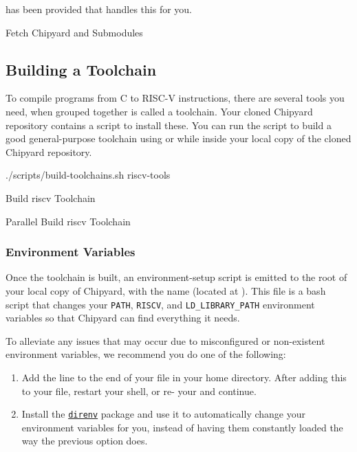  has been provided that handles this for you.

\begin{listing}[h!tbp]
\caption{Fetch Chipyard and Submodules}
\label{lst:Fetch_Chipyard_and_Submodules}
\end{listing}

\subsection{Building a Toolchain}\label{sec:Building_Toolchain}
To compile programs from C to RISC-V instructions, there are several tools you need, when grouped together is called a toolchain.
Your cloned Chipyard repository contains a script to install these.
You can run the script to build a good general-purpose toolchain using  or  while inside your local copy of the cloned Chipyard repository.

\begin{listing}[h!tbp]
\begin{bashsource}
./scripts/build-toolchains.sh riscv-tools
\end{bashsource}
\caption{Build \Gls{riscv} Toolchain}
\label{lst:Build_RISCV_Toolchain}
\end{listing}

\begin{listing}[h!tbp]
\begin{bashsource}
export MAKEFLAGS=-j[N]; ./scripts/build-toolchains.sh riscv-tools}
\end{bashsource}
\caption{Parallel Build \Gls{riscv} Toolchain}
\label{lst:Build_RISCV_Toolchain-Parallel}
\end{listing}

\subsubsection{Environment Variables}\label{sec:Environment_Variables}
Once the toolchain is built, an environment-setup script is emitted to the root of your local copy of Chipyard, with the name  (located at ).
This file is a bash script that changes your \texttt{PATH}, \texttt{RISCV}, and \texttt{LD\_LIBRARY\_PATH} environment variables so that Chipyard can find everything it needs.

To alleviate any issues that may occur due to misconfigured or non-existent environment variables, we recommend you do one of the following:
\begin{enumerate}
\item Add the line  to the end of your  file in your home directory.
  After adding this to your  file, restart your shell, or re- your  and continue.
\item Install the \href{https://direnv.net/}{\texttt{direnv}} package and use it to automatically change your environment variables for you, instead of having them constantly loaded the way the previous option does.
\end{enumerate}

